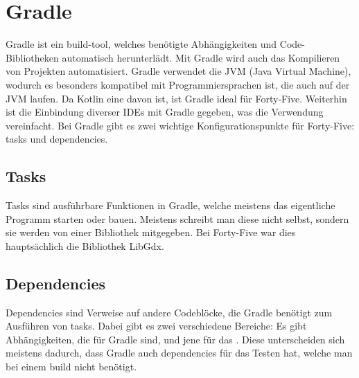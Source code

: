 
\renewcommand{\kapitelautor}{Autor: Felix Zwickelstorfer}
\section{Gradle}\label{sec:gradle}

\renewcommand{\kapitelautor}{Autor: Felix Zwickelstorfer}

Gradle ist ein build-tool, welches benötigte Abhängigkeiten und Code-Bibliotheken automatisch herunterlädt.
Mit Gradle wird auch das Kompilieren von Projekten automatisiert.
Gradle verwendet die JVM (Java Virtual Machine), wodurch es besonders kompatibel mit Programmiersprachen ist, die auch auf der JVM laufen.
Da Kotlin eine davon ist, ist Gradle ideal für Forty-Five.
Weiterhin ist die Einbindung diverser IDEs mit Gradle gegeben, was die Verwendung vereinfacht.
Bei Gradle gibt es zwei wichtige Konfigurationspunkte für Forty-Five: tasks und dependencies.

\subsection{Tasks}\label{subsec:tasks}

Tasks sind ausführbare Funktionen in Gradle, welche meistens das eigentliche Programm starten oder bauen.
Meistens schreibt man diese nicht selbst, sondern sie werden von einer Bibliothek mitgegeben.
Bei Forty-Five war dies hauptsächlich die Bibliothek LibGdx.

\subsection{Dependencies}\label{subsec:dependencies}

Dependencies sind Verweise auf andere Codeblöcke, die Gradle benötigt zum Ausführen von tasks.
Dabei gibt es zwei verschiedene Bereiche: Es gibt Abhängigkeiten, die für Gradle sind, und jene für das .
Diese unterscheiden sich meistens dadurch, dass Gradle auch dependencies für das Testen hat, welche man bei einem build nicht benötigt.
